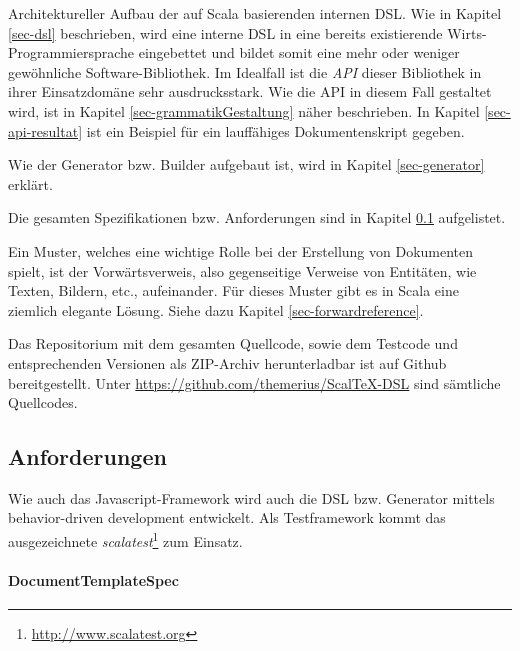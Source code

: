 Architektureller Aufbau der auf Scala basierenden internen DSL. Wie in
Kapitel \ref{sec-dsl} beschrieben, wird eine interne DSL in eine bereits
existierende Wirts-Programmiersprache eingebettet und bildet somit
eine mehr oder weniger gewöhn\-liche Software-Bibliothek. Im Idealfall ist
die \emph{API} dieser Bibliothek in ihrer Einsatzdomäne sehr ausdrucksstark.
Wie die API in diesem Fall gestaltet wird, ist in Kapitel
\ref{sec-grammatikGestaltung} näher beschrieben. In Kapitel
\ref{sec-api-resultat} ist ein Beispiel für ein lauffähiges
Dokumentenskript gegeben.

Wie der Generator bzw. Builder aufgebaut ist, wird in
Kapitel \ref{sec-generator} erklärt.

Die gesamten Spezifikationen bzw. Anforderungen sind in Kapitel
\ref{sec-dsl_anforderungen} aufgelistet.

Ein Muster, welches eine wichtige Rolle bei der Erstellung von Dokumenten
spielt, ist der Vorwärtsverweis, also gegenseitige Verweise von Entitäten,
wie Texten, Bildern, etc., aufeinander. Für dieses Muster gibt es in Scala
eine ziemlich elegante Lösung. Siehe dazu Kapitel \ref{sec-forwardreference}.

Das Repositorium mit dem gesamten Quellcode, sowie dem Testcode
und entsprechenden Versionen als ZIP-Archiv herunterladbar ist auf Github bereitgestellt.
Unter \url{https://github.com/themerius/ScalTeX-DSL} sind sämtliche
Quellcodes.

\subsection{Anforderungen}\label{sec-dsl_anforderungen}

Wie auch das Javascript-Framework wird auch die DSL bzw. Generator
mittels behavior-driven development entwickelt. Als Testframework
kommt das ausgezeichnete
\emph{scalatest}\footnote{\url{http://www.scalatest.org}} zum Einsatz.

\paragraph{DocumentTemplateSpec}

